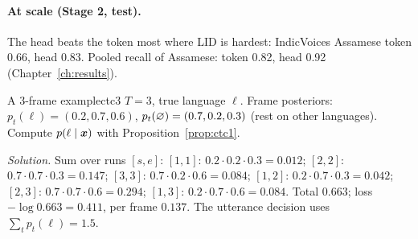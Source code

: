 \paragraph{At scale (Stage 2, test).} The head beats the token most where LID is hardest: IndicVoices Assamese token 0.66, head
0.83. Pooled recall of Assamese: token 0.82, head 0.92 (Chapter~\ref{ch:results}).

\begin{exercise}{A 3-frame example}{ctc3}
$T=3$, true language $\ell$. Frame posteriors: $p_t(\ell)=(0.2,0.7,0.6)$, $p_t(\varnothing)=(0.7,0.2,0.3)$ (rest on other languages).
Compute $p(\ell\mid\bm{x})$ with Proposition~\ref{prop:ctc1}.\par
\textit{Solution.} Sum over runs $[s,e]$:
$[1,1]$: $0.2\cdot0.2\cdot0.3=0.012$; $[2,2]$: $0.7\cdot0.7\cdot0.3=0.147$; $[3,3]$: $0.7\cdot0.2\cdot0.6=0.084$;
$[1,2]$: $0.2\cdot0.7\cdot0.3=0.042$; $[2,3]$: $0.7\cdot0.7\cdot0.6=0.294$; $[1,3]$: $0.2\cdot0.7\cdot0.6=0.084$.
Total $0.663$; loss $-\log0.663=0.411$, per frame $0.137$. The utterance decision uses $\sum_tp_t(\ell)=1.5$.
\end{exercise}
